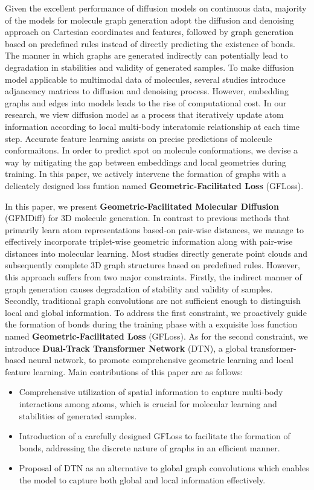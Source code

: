 \documentclass[letterpaper]{article} %
\begin{document}
Given the excellent performance of diffusion models on continuous data, majority of the models for molecule graph generation adopt the diffusion and denoising approach on Cartesian coordinates and features, followed by graph generation based on predefined rules instead of directly predicting the existence of bonds. The manner in which graphs are generated indirectly can potentially lead to degradation in stabilities and validity of generated samples. To make diffusion model applicable to multimodal data of molecules, several studies \cite{edpgnn_20_niu,digress_22_vignac,midi_23_vignac} introduce adjancency matrices to diffusion and denoising process. However, embedding graphs and edges into models leads to the rise of computational cost. In our research, we view diffusion model as a process that iteratively update atom information according to local multi-body interatomic relationship at each time step. Accurate feature learning assists on precise predictions of molecule conformaitons. In order to predict spot on molecule conformations, we devise a way by mitigating the gap between embeddings and local geometries during training. In this paper, we actively intervene the formation of graphs with a delicately designed loss funtion named \textbf{Geometric-Facilitated Loss} (GFLoss).


In this paper, we present \textbf{Geometric-Facilitated Molecular Diffusion} (GFMDiff) for 3D molecule generation. In contrast to previous methods that primarily learn atom representations based-on pair-wise distances, we manage to effectively incorporate triplet-wise geometric information along with pair-wise distances into molecular learning. Most studies directly generate point clouds and subsequently complete 3D graph structures based on predefined rules. However, this approach suffers from two major constraints. Firstly, the indirect manner of graph generation causes degradation of stability and validity of samples. Secondly, traditional graph convolutions are not sufficient enough to distinguish local and global information. To address the first constraint, we proactively guide the formation of bonds during the training phase with a exquisite loss function named \textbf{Geometric-Facilitated Loss} (GFLoss). As for the second constraint, we introduce \textbf{Dual-Track Transformer Network} (DTN), a global transformer-based neural network, to promote comprehensive geometric learning and local feature learning. Main contributions of this paper are as follows:
\begin{itemize}
\item Comprehensive utilization of spatial information to capture multi-body interactions among atoms, which is crucial for molecular learning and stabilities of generated samples.
\item Introduction of a carefully designed GFLoss to facilitate the formation of bonds, addressing the discrete nature of graphs in an efficient manner.
\item Proposal of DTN as an alternative to global graph convolutions which enables the model to capture both global and local information effectively.
\end{itemize}
\end{document}
